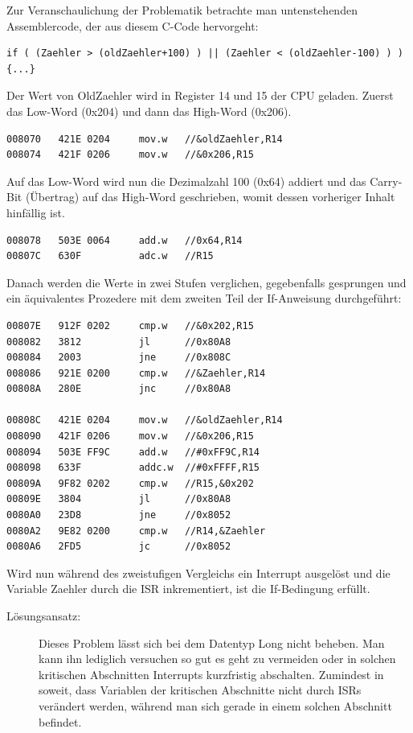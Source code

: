 \documentclass[12pt,a4paper,bibliography=totocnumbered,listof=totocnumbered]{scrartcl}
\begin{document}
Zur Veranschaulichung der Problematik betrachte man untenstehenden Assemblercode, der aus diesem C-Code hervorgeht:

\begin{lstlisting}[caption=C-Code MSP430, label=lst:LongInterruptC]
if ( (Zaehler > (oldZaehler+100) ) || (Zaehler < (oldZaehler-100) ) ) {...}
\end{lstlisting}

Der Wert von OldZaehler wird in Register 14 und 15 der CPU geladen. Zuerst das Low-Word (0x204) und dann das High-Word (0x206).
\begin{lstlisting}[caption=Assemblercode MSP430, label=lst:LongInterruptA1]
008070   421E 0204     mov.w   //&oldZaehler,R14
008074   421F 0206     mov.w   //&0x206,R15
\end{lstlisting}

Auf das Low-Word wird nun die Dezimalzahl 100 (0x64) addiert und das Carry-Bit (Übertrag) auf das High-Word geschrieben, womit dessen vorheriger Inhalt hinfällig ist.
\begin{lstlisting}[caption=Assemblercode MSP430, label=lst:LongInterruptA2]
008078   503E 0064     add.w   //0x64,R14
00807C   630F          adc.w   //R15
\end{lstlisting}

Danach werden die Werte in zwei Stufen verglichen, gegebenfalls gesprungen und ein äquivalentes Prozedere mit dem zweiten Teil der If-Anweisung durchgeführt:
\begin{lstlisting}[caption=Assemblercode MSP430, label=lst:LongInterruptA3]
00807E   912F 0202     cmp.w   //&0x202,R15
008082   3812          jl      //0x80A8
008084   2003          jne     //0x808C
008086   921E 0200     cmp.w   //&Zaehler,R14
00808A   280E          jnc     //0x80A8

00808C   421E 0204     mov.w   //&oldZaehler,R14  
008090   421F 0206     mov.w   //&0x206,R15
008094   503E FF9C     add.w   //#0xFF9C,R14
008098   633F          addc.w  //#0xFFFF,R15 
00809A   9F82 0202     cmp.w   //R15,&0x202
00809E   3804          jl      //0x80A8
0080A0   23D8          jne     //0x8052
0080A2   9E82 0200     cmp.w   //R14,&Zaehler
0080A6   2FD5          jc      //0x8052
\end{lstlisting}

Wird nun während des zweistufigen Vergleichs ein Interrupt ausgelöst und die Variable Zaehler durch die ISR inkrementiert, ist die If-Bedingung erfüllt.
\begin{description}
	\item[Lösungsansatz:] Dieses Problem lässt sich bei dem Datentyp Long nicht beheben. Man kann ihn lediglich versuchen so gut es geht zu vermeiden oder in solchen kritischen Abschnitten Interrupts kurzfristig abschalten. Zumindest in soweit, dass Variablen der kritischen Abschnitte nicht durch ISRs verändert werden, während man sich gerade in einem solchen Abschnitt befindet.
\end{description}
\pagebreak
\end{document}
